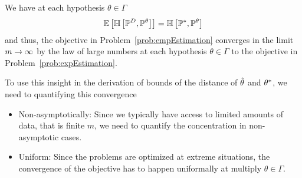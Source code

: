 

We have at each hypothesis $\theta\in\Gamma$
\begin{align}
	\mathbb{E}\left[\mathbb{H}\left[\mathbb{P}^{D},\mathbb{P}^{\theta}\right]\right] = \mathbb{H}\left[\mathbb{P}^*,\mathbb{P}^{\theta}\right]
\end{align}
and thus, the objective in Problem~\ref{prob:empEstimation} converges in the limit $m\rightarrow\infty$ by the law of large numbers at each hypothesis $\theta\in\Gamma$ to the objective in Problem~\ref{prob:expEstimation}.

To use this insight in the derivation of bounds of the distance of $\hat{\theta}$ and $\theta^*$, we need to quantifying this convergence 
\begin{itemize}
	\item Non-asymptotically: Since we typically have access to limited amounts of data, that is finite $m$, we need to quantify the concentration in non-asymptotic cases.
	\item Uniform: Since the problems are optimized at extreme situations, the convergence of the objective has to happen uniformally at multiply $\theta\in\Gamma$.
\end{itemize}


%


